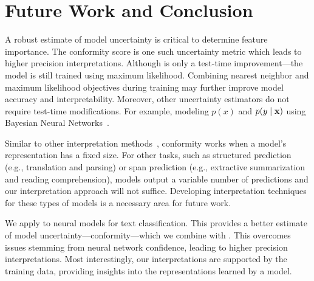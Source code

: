 \section{Future Work and Conclusion}
\label{sec:conclusion}

A robust estimate of model uncertainty is critical to determine
feature importance. The \dknn{} conformity score is
one such uncertainty metric which leads to higher precision interpretations.
Although \dknn{} is only a test-time improvement---the model is
still trained using maximum likelihood. Combining nearest
neighbor and maximum likelihood objectives during training may further
improve model accuracy and
interpretability. Moreover, other uncertainty estimators
do not require test-time modifications. For
example, modeling $p(x)$ and $p(y\mid\boldsymbol{\mathbf{x}})$ using Bayesian Neural
Networks~\cite{gal2016uncertainty}.

Similar to other  interpretation
methods~\cite{sundararajan2017axiomatic, li2016understanding}, conformity
\loo{} works when a model's representation has a fixed size. For
other  tasks, such as structured prediction (e.g., translation and
parsing) or span prediction (e.g., extractive summarization and reading
comprehension), models output a variable number of predictions and our interpretation
approach will not suffice. Developing interpretation techniques for these
types of models is a necessary area for future work.

We apply \dknn{} to neural models for text classification. This provides a
better estimate of model uncertainty---conformity---which we combine with
\loo{}. This overcomes issues stemming from neural network confidence,
leading to higher precision interpretations. Most interestingly,
our interpretations are supported by the training data,
providing insights into the representations learned by a model.
